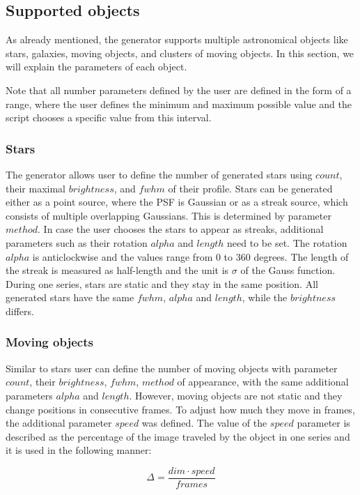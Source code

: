 \subsection{Supported objects}
As already mentioned, the generator supports multiple astronomical objects like stars, galaxies, moving objects, and clusters of moving objects. In this section, we will explain the parameters of each object. 

Note that all number parameters defined by the user are defined in the form of a range, where the user defines the minimum and maximum possible value and the script chooses a specific value from this interval. 

\subsubsection{Stars}
The generator allows user to define the number of generated stars using $count$, their maximal $brightness$, and $fwhm$ of their profile. Stars can be generated either as a point source, where the PSF is Gaussian or as a streak source, which consists of multiple overlapping Gaussians. This is determined by parameter $method$. In case the user chooses the stars to appear as streaks, additional parameters such as their rotation $alpha$ and $length$ need to be set. The rotation $alpha$ is anticlockwise and the values range from 0 to 360 degrees. The length of the streak is measured as half-length and the unit is $\sigma$ of the Gauss function. During one series, stars are static and they stay in the same position. All generated stars have the same $fwhm$, $alpha$ and $length$, while the $brightness$ differs. 

\subsubsection{Moving objects}
Similar to stars user can define the number of moving objects with parameter $count$, their $brightness$, $fwhm$, $method$ of appearance, with the same additional parameters $alpha$ and $length$. However, moving objects are not static and they change positions in consecutive frames. To adjust how much they move in frames, the additional parameter $speed$ was defined. The value of the $speed$ parameter is described as the percentage of the image traveled by the object in one series and it is used in the following manner: 

\begin{equation}
    \Delta = \frac{dim \cdot speed}{frames} 
\end{equation}

